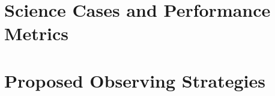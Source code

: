 \documentclass[11pt,headsepline,cleardoubleempty,twoside,openright]{scrbook}
\begin{document}


% 


\part{Science Cases and Performance Metrics}
\def\partname{science}\label{part:\partname}















\part{Proposed Observing Strategies}
\def\partname{proposals}\label{part:\partname}

% 
% 
% 
% 

% 





\appendix







\end{document}
